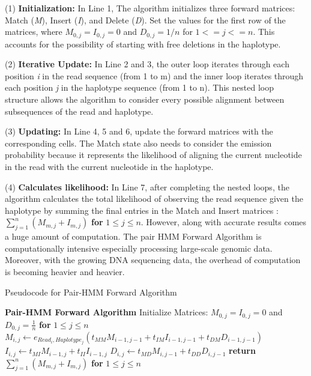 \documentclass[PhD]{PHlab-thesis}
\begin{document}
(1) \textbf{Initialization:} In Line 1, The algorithm initializes three forward matrices: Match (\textit{M}), Insert (\textit{I}), and Delete (\textit{D}). Set the values for the first row of the matrices, where $M_{0,j}= I_{0,j} = 0 $ and $D_{0,j} = 1 / n $ for $1 <= j <= n$. This accounts for the possibility of starting with free deletions in the haplotype. 

(2) \textbf{Iterative Update:} In Line 2 and 3, the outer loop iterates through each position \textit{i} in the read sequence (from 1 to m) and the inner loop iterates through each position \textit{j} in the haplotype sequence (from 1 to n). This nested loop structure allows the algorithm to consider every possible alignment between subsequences of the read and haplotype.

(3) \textbf{Updating:} In Line 4, 5 and 6, update the forward matrices with the corresponding cells. The Match state also needs to consider the emission probability because it represents the likelihood of aligning the current nucleotide in the read with the current nucleotide in the haplotype. 

(4) \textbf{Calculates likelihood:} In Line 7, after completing the nested loops, the algorithm calculates the total likelihood of observing the read sequence given the haplotype by summing the final entries in the Match and Insert matrices : $\sum_{j=1}^{n} (M_{m,j} + I_{m,j})$ \textbf{for} $1 \leq j \leq n$.\newline
However, along with accurate results comes a huge amount of computation. The pair HMM Forward Algorithm is computationally intensive especially  processing large-scale genomic data. Moreover, with the growing DNA sequencing data, the overhead of computation is becoming heavier and heavier. \newline

\begin{algorithm}
\caption{Pseudocode for Pair-HMM Forward Algorithm}
\begin{algorithmic}[1]
\Procedure\textbf{Pair-HMM Forward Algorithm}
\State Initialize Matrices: $M_{0,j} = I_{0,j} = 0$ and $D_{0,j} = \frac{1}{n}$ \textbf{for} $1 \leq j \leq n$
        \State $M_{i,j} \gets e_{Read_{i},Haplotype_{j}} (t_{MM} M_{i-1,j-1}  + t_{IM} I_{i-1,j-1}  +  t_{DM} D_{i-1,j-1})$
        \State $I_{i,j} \gets t_{MI} M_{i-1,j}  + t_{II} I_{i-1,j} $
        \State $D_{i,j} \gets t_{MD} M_{i,j-1} + t_{DD} D_{i,j-1} $
    \EndFor
\EndFor
\State \textbf{return }$\sum_{j=1}^{n} (M_{m,j} + I_{m,j})$ \textbf{for} $1 \leq j \leq n$
\EndProcedure
\end{algorithmic}
\end{algorithm}
\end{document}

